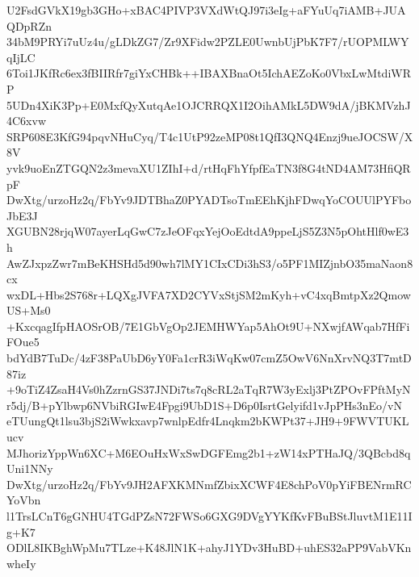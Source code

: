 U2FsdGVkX19gb3GHo+xBAC4PIVP3VXdWtQJ97i3eIg+aFYuUq7iAMB+JUAQDpRZn
34bM9PRYi7uUz4u/gLDkZG7/Zr9XFidw2PZLE0UwnbUjPbK7F7/rUOPMLWYqIjLC
6Toi1JKfRc6ex3fBIIRfr7giYxCHBk++IBAXBnaOt5IchAEZoKo0VbxLwMtdiWRP
5UDn4XiK3Pp+E0MxfQyXutqAe1OJCRRQX1I2OihAMkL5DW9dA/jBKMVzhJ4C6xvw
SRP608E3KfG94pqvNHuCyq/T4c1UtP92zeMP08t1QfI3QNQ4Enzj9ueJOCSW/X8V
yvk9uoEnZTGQN2z3mevaXU1ZIhI+d/rtHqFhYfpfEaTN3f8G4tND4AM73HfiQRpF
DwXtg/urzoHz2q/FbYv9JDTBhaZ0PYADTsoTmEEhKjhFDwqYoCOUUlPYFboJbE3J
XGUBN28rjqW07ayerLqGwC7zJeOFqxYejOoEdtdA9ppeLjS5Z3N5pOhtHlf0wE3h
AwZJxpzZwr7mBeKHSHd5d90wh7lMY1CIxCDi3hS3/o5PF1MIZjnbO35maNaon8cx
wxDL+Hbs2S768r+LQXgJVFA7XD2CYVxStjSM2mKyh+vC4xqBmtpXz2QmowUS+Ms0
+KxcqagIfpHAOSrOB/7E1GbVgOp2JEMHWYap5AhOt9U+NXwjfAWqab7HfFiFOue5
bdYdB7TuDc/4zF38PaUbD6yY0Fa1crR3iWqKw07cmZ5OwV6NnXrvNQ3T7mtD87iz
+9oTiZ4ZsaH4Vs0hZzrnGS37JNDi7ts7q8cRL2aTqR7W3yExlj3PtZPOvFPftMyN
r5dj/B+pYlbwp6NVbiRGIwE4Fpgi9UbD1S+D6p0IsrtGelyifd1vJpPHs3nEo/vN
eTUungQt1lsu3bjS2iWwkxavp7wnlpEdfr4Lnqkm2bKWPt37+JH9+9FWVTUKLucv
MJhorizYppWn6XC+M6EOuHxWxSwDGFEmg2b1+zW14xPTHaJQ/3QBcbd8qUni1NNy
DwXtg/urzoHz2q/FbYv9JH2AFXKMNmfZbixXCWF4E8chPoV0pYiFBENrmRCYoVbn
l1TrsLCnT6gGNHU4TGdPZsN72FWSo6GXG9DVgYYKfKvFBuBStJluvtM1E11Ig+K7
ODlL8IKBghWpMu7TLze+K48JlN1K+ahyJ1YDv3HuBD+uhES32aPP9VabVKnwheIy
